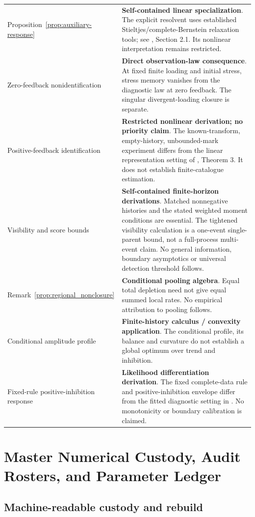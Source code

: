 \begin{longtable}{@{}>{\raggedright\arraybackslash}p{}>{\raggedright\arraybackslash}p{}@{}}
Proposition~\ref{prop:auxiliary-response} & \textbf{Self-contained linear specialization}. The explicit resolvent uses established Stieltjes/complete-Bernstein relaxation tools; see \citet{MeerschaertToaldo2019}, Section 2.1. Its nonlinear interpretation remains restricted. \\
Zero-feedback nonidentification & \textbf{Direct observation-law consequence}. At fixed finite loading and initial stress, stress memory vanishes from the diagnostic law at zero feedback. The singular divergent-loading closure is separate. \\
Positive-feedback identification & \textbf{Restricted nonlinear derivation; no priority claim}. The known-transform, empty-history, unbounded-mark experiment differs from the linear representation setting of \citet{DavisKresinBaeumerWang2026}, Theorem 3. It does not establish finite-catalogue estimation. \\
Visibility and score bounds & \textbf{Self-contained finite-horizon derivations}. Matched nonnegative histories and the stated weighted moment conditions are essential. The tightened visibility calculation is a one-event single-parent bound, not a full-process multi-event claim. No general information, boundary asymptotics or universal detection threshold follows. \\
Remark~\ref{prop:regional_nonclosure} & \textbf{Conditional pooling algebra}. Equal total depletion need not give equal summed local rates. No empirical attribution to pooling follows. \\
Conditional amplitude profile & \textbf{Finite-history calculus / convexity application}. The conditional profile, its balance and curvature do not establish a global optimum over trend and inhibition. \\
Fixed-rule positive-inhibition response & \textbf{Likelihood differentiation derivation}. The fixed complete-data rule and positive-inhibition envelope differ from the fitted diagnostic setting in \citet{KlingVetter2024}. No monotonicity or boundary calibration is claimed. \\
\bottomrule
\end{longtable}


\chapter{Master Numerical Custody, Audit Rosters, and Parameter Ledger}\label{app:custody}

\section{Machine-readable custody and rebuild}

